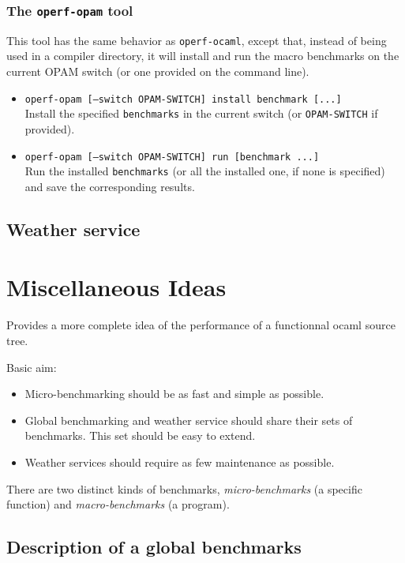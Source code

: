\documentclass[11pt,a4paper]{article}
\begin{document}
\subsubsection{The {\tt operf-opam} tool}

This tool has the same behavior as {\tt operf-ocaml}, except that,
instead of being used in a compiler directory, it will install and run
the macro benchmarks on the current OPAM switch (or one provided on
the command line).

\begin{itemize}
\item {\tt operf-opam [--switch OPAM-SWITCH] install benchmark [...]}\\
  Install the specified {\tt benchmarks} in the current switch (or 
  {\tt OPAM-SWITCH} if provided).
\item {\tt operf-opam [--switch OPAM-SWITCH] run [benchmark ...]}\\
  Run the installed {\tt benchmarks} (or all the installed one, if none
  is specified) and save the corresponding results.
\end{itemize}

\subsection{Weather service}

\section{Miscellaneous Ideas}

Provides a more complete idea of the performance of a functionnal
ocaml source tree.


Basic aim:
\begin{itemize}
\item Micro-benchmarking should be as fast and simple as possible.
\item Global benchmarking and weather service should share their sets
  of benchmarks. This set should be easy to extend.
\item Weather services should require as few maintenance as possible.
\end{itemize}

There are two distinct kinds of benchmarks, \emph{micro-benchmarks} (a specific
function) and \emph{macro-benchmarks} (a program).

\subsection{Description of a global benchmarks}
\end{document}
